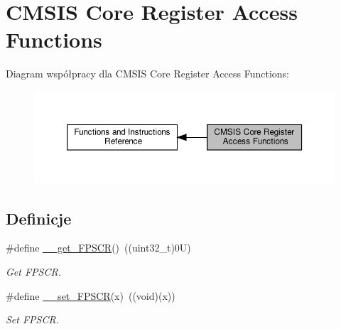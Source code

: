 \hypertarget{group___c_m_s_i_s___core___reg_acc_functions}{}\section{C\+M\+S\+IS Core Register Access Functions}
\label{group___c_m_s_i_s___core___reg_acc_functions}
Diagram współpracy dla C\+M\+S\+IS Core Register Access Functions\+:\nopagebreak
\begin{figure}[H]
\begin{center}
\leavevmode
\includegraphics[width=350pt]{group___c_m_s_i_s___core___reg_acc_functions}
\end{center}
\end{figure}
\subsection*{Definicje}
\begin{DoxyCompactItemize}
\item 
\#define \hyperlink{group___c_m_s_i_s___core___reg_acc_functions_ga4d0739b1355ca5642a7ce76df1271f01}{\+\_\+\+\_\+get\+\_\+\+F\+P\+S\+CR}()~((uint32\+\_\+t)0\+U)
\begin{DoxyCompactList}\small\item\em Get F\+P\+S\+CR. \end{DoxyCompactList}\item 
\#define \hyperlink{group___c_m_s_i_s___core___reg_acc_functions_ga3cd91c42ad2793c3f3ae553a1b975512}{\+\_\+\+\_\+set\+\_\+\+F\+P\+S\+CR}(x)~((void)(x))
\begin{DoxyCompactList}\small\item\em Set F\+P\+S\+CR. \end{DoxyCompactList}\end{DoxyCompactItemize}

